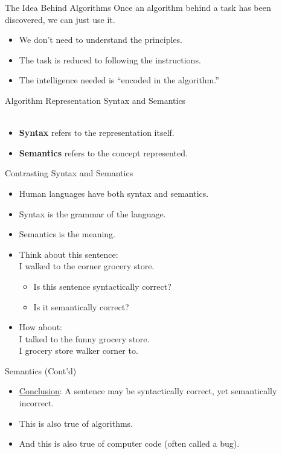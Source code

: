 \documentclass[graphics]{beamer}
\begin{document}
\begin{frame}{The Idea Behind Algorithms}
    Once an algorithm behind a task has been discovered, we can just use it.
    \begin{itemize}
        \item We don't need to understand the principles.
        \item The task is reduced to following the instructions.
        \item The intelligence needed is ``encoded in the algorithm.''
    \end{itemize}
\end{frame}

\begin{frame}{Algorithm Representation}
    Syntax and Semantics \\ ~~ \\
    \begin{itemize}
        \item \textbf{Syntax} refers to the representation itself.
        \item \textbf{Semantics} refers to the concept represented.
    \end{itemize}
\end{frame}

\begin{frame}{Contrasting Syntax and Semantics}
    \begin{itemize}
        \item Human languages have both syntax and semantics.
        \item Syntax is the grammar of the language.
        \item Semantics is the meaning.
        \item Think about this sentence: \\ I walked to the corner grocery store.
        \begin{itemize}
            \item Is this sentence syntactically correct?
            \item Is it semantically correct?
        \end{itemize}
        \pause \item How about: \\ I talked to the funny grocery store.
        \pause \\ I grocery store walker corner to.
    \end{itemize}
\end{frame}

\begin{frame}{Semantics (Cont'd)}
    \begin{itemize}
        \item \underline{Conclusion}: A sentence may be syntactically correct, yet semantically incorrect.
        \item This is also true of algorithms.
        \item And this is also true of computer code (often called a bug).
    \end{itemize}
\end{frame}
\end{document}
